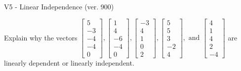 \begin{exercise}
  \begin{exerciseTitle}V5 - Linear Independence (ver. 900)\end{exerciseTitle}
  \begin{exerciseStatement}
    Explain why the vectors \(\left[\begin{array}{r}
5 \\
-3 \\
-4 \\
-4 \\
0
\end{array}\right] , \left[\begin{array}{r}
1 \\
4 \\
-6 \\
-4 \\
0
\end{array}\right] , \left[\begin{array}{r}
-3 \\
4 \\
1 \\
0 \\
2
\end{array}\right] , \left[\begin{array}{r}
5 \\
5 \\
3 \\
-2 \\
4
\end{array}\right] , \text{ and } \left[\begin{array}{r}
4 \\
1 \\
4 \\
2 \\
-4
\end{array}\right]\) are linearly dependent or linearly independent.	



\end{exerciseStatement}
\end{exercise}
